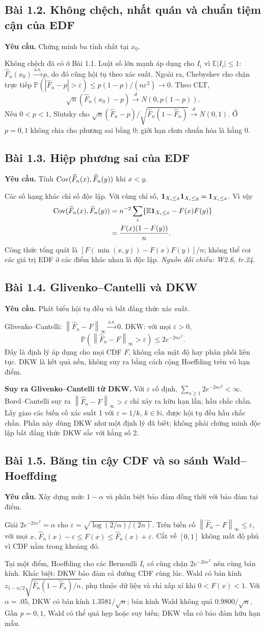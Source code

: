 \documentclass[11pt,a4paper]{article}
\newcommand{\E}{\mathbb E}\newcommand{\Pp}{\mathbb P}
\newcommand{\Fh}{\widehat F_n}\newcommand{\fh}{\widehat f_h}
\newcommand{\dto}{\xrightarrow{d}}\newcommand{\pto}{\xrightarrow{P}}
\newcommand{\asto}{\xrightarrow{\mathrm{a.s.}}}
\newcommand{\norm}[1]{\left\lVert#1\right\rVert}
\newcommand{\src}[1]{\textit{Nguồn đối chiếu: #1.}}
\newcommand{\prob}[3]{\subsection{Bài #1. #2}\label{b:#1}\textbf{Yêu cầu.} #3\par}
\begin{document}
\prob{1.2}{Không chệch, nhất quán và chuẩn tiệm cận của EDF}{Chứng minh ba tính chất tại $x_0$.}
Không chệch đã có ở Bài 1.1. Luật số lớn mạnh áp dụng cho $I_i$ vì $\E|I_i|\le1$:
$\Fh(x_0)\asto p$, do đó cũng hội tụ theo xác suất. Ngoài ra, Chebyshev cho chặn trực tiếp
$\Pp(|\Fh-p|>\varepsilon)\le p(1-p)/(n\varepsilon^2)\to0$.
Theo CLT,
\[
\sqrt n(\Fh(x_0)-p)\dto N(0,p(1-p)).
\]
Nếu $0<p<1$, Slutsky cho
$\sqrt n(\Fh-p)/\sqrt{\Fh(1-\Fh)}\dto N(0,1)$.
Ở $p=0,1$ không chia cho phương sai bằng 0; giới hạn chưa chuẩn hóa là hằng 0.

\prob{1.3}{Hiệp phương sai của EDF}{Tính $\Cov(\Fh(x),\Fh(y))$ khi $x<y$.}
Các số hạng khác chỉ số độc lập. Với cùng chỉ số, $\mathbf 1_{X_i\le x}\mathbf 1_{X_i\le y}=\mathbf 1_{X_i\le x}$. Vì vậy
\begin{align*}
\Cov(\Fh(x),\Fh(y))
&=n^{-2}\sum_i\{\E\1_{X_i\le x}-F(x)F(y)\}\\
&=\frac{F(x)(1-F(y))}{n}.
\end{align*}
Công thức tổng quát là $[F(\min(x,y))-F(x)F(y)]/n$; không thể coi các giá trị EDF ở các điểm khác nhau là độc lập.
\src{W2.6, tr.24}

\prob{1.4}{Glivenko--Cantelli và DKW}{Phát biểu hội tụ đều và bất đẳng thức xác suất.}
Glivenko--Cantelli: $\norm{\Fh-F}_\infty\asto0$. DKW: với mọi $\varepsilon>0$,
\[
\Pp(\norm{\Fh-F}_\infty>\varepsilon)\le2e^{-2n\varepsilon^2}.
\]
Đây là định lý áp dụng cho mọi CDF $F$, không cần mật độ hay phân phối liên tục. DKW là kết quả nền, không suy ra bằng cách cộng Hoeffding trên vô hạn điểm.

\textbf{Suy ra Glivenko--Cantelli từ DKW.} Với $\varepsilon$ cố định,
$\sum_{n\ge1}2e^{-2n\varepsilon^2}<\infty$. Borel--Cantelli suy ra
$\norm{\Fh-F}_\infty>\varepsilon$ chỉ xảy ra hữu hạn lần, hầu chắc chắn. Lấy giao các biến cố xác suất 1 với $\varepsilon=1/k$, $k\in\mathbb N$, được hội tụ đều hầu chắc chắn. Phần này dùng DKW như một định lý đã biết; không phải chứng minh độc lập bất đẳng thức DKW sắc với hằng số 2.

\prob{1.5}{Băng tin cậy CDF và so sánh Wald--Hoeffding}{Xây dựng mức $1-\alpha$ và phân biệt bảo đảm đồng thời với bảo đảm tại điểm.}
Giải $2e^{-2n\varepsilon^2}=\alpha$ cho $\varepsilon=\sqrt{\log(2/\alpha)/(2n)}$. Trên biến cố $\norm{\Fh-F}_\infty\le\varepsilon$, với mọi $x$,
$\Fh(x)-\varepsilon\le F(x)\le\Fh(x)+\varepsilon$. Cắt về $[0,1]$ không mất độ phủ vì CDF nằm trong khoảng đó.

Tại một điểm, Hoeffding cho các Bernoulli $I_i$ có cùng chặn $2e^{-2n\varepsilon^2}$ nên cùng bán kính. Khác biệt: DKW bảo đảm cả đường CDF cùng lúc. Wald có bán kính
$z_{1-\alpha/2}\sqrt{\Fh(1-\Fh)/n}$, phụ thuộc dữ liệu và chỉ xấp xỉ khi $0<F(x)<1$.
Với $\alpha=.05$, DKW có bán kính $1.3581/\sqrt n$; bán kính Wald không quá $0.9800/\sqrt n$. Gần $p=0,1$, Wald có thể quá hẹp hoặc suy biến; DKW vẫn có bảo đảm hữu hạn mẫu.
\end{document}
